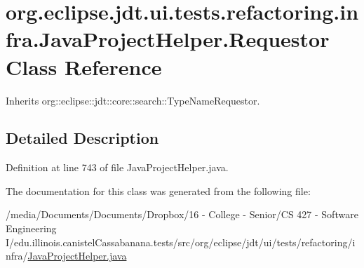 \hypertarget{classorg_1_1eclipse_1_1jdt_1_1ui_1_1tests_1_1refactoring_1_1infra_1_1JavaProjectHelper_1_1Requestor}{
\section{org.eclipse.jdt.ui.tests.refactoring.infra.JavaProjectHelper.Requestor Class Reference}
\label{classorg_1_1eclipse_1_1jdt_1_1ui_1_1tests_1_1refactoring_1_1infra_1_1JavaProjectHelper_1_1Requestor}
}


Inherits org::eclipse::jdt::core::search::TypeNameRequestor.



\subsection{Detailed Description}


Definition at line 743 of file JavaProjectHelper.java.



The documentation for this class was generated from the following file:\begin{DoxyCompactItemize}
\item 
/media/Documents/Documents/Dropbox/16 -\/ College -\/ Senior/CS 427 -\/ Software Engineering I/edu.illinois.canistelCassabanana.tests/src/org/eclipse/jdt/ui/tests/refactoring/infra/\hyperlink{JavaProjectHelper_8java}{JavaProjectHelper.java}\end{DoxyCompactItemize}

